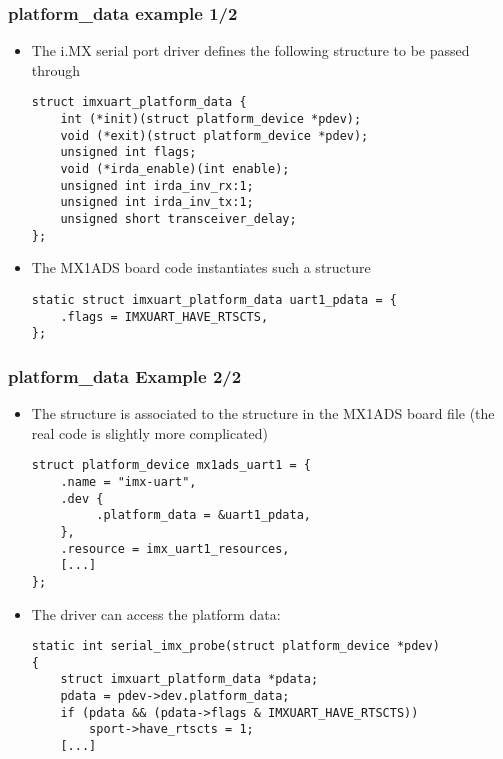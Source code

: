 \begin{frame}[fragile]
  \frametitle{platform\_data example 1/2}
  \begin{itemize}
  \item The i.MX serial port driver defines the following structure to
    be passed through 
    \begin{block}{}
  \begin{verbatim}
struct imxuart_platform_data {
    int (*init)(struct platform_device *pdev);
    void (*exit)(struct platform_device *pdev);
    unsigned int flags;
    void (*irda_enable)(int enable);
    unsigned int irda_inv_rx:1;
    unsigned int irda_inv_tx:1;
    unsigned short transceiver_delay;
};
  \end{verbatim}
  \end{block}
  \item The MX1ADS board code instantiates such a structure
    \begin{block}{}
  \begin{verbatim}
static struct imxuart_platform_data uart1_pdata = {
    .flags = IMXUART_HAVE_RTSCTS,
};
  \end{verbatim}
  \end{block}
  \end{itemize}
\end{frame}

\begin{frame}[fragile]
  \frametitle{platform\_data Example 2/2}
  \begin{itemize}
  \item The  structure is associated to the
     structure in the MX1ADS board file (the real code is
    slightly more complicated)
    \begin{block}{}
  \begin{verbatim}
struct platform_device mx1ads_uart1 = {
    .name = "imx-uart",
    .dev {
         .platform_data = &uart1_pdata,
    },
    .resource = imx_uart1_resources,
    [...]
};
  \end{verbatim}
  \end{block}
  \item The driver can access the platform data:
    \begin{block}{}
  \begin{verbatim}
static int serial_imx_probe(struct platform_device *pdev)
{
    struct imxuart_platform_data *pdata;
    pdata = pdev->dev.platform_data;
    if (pdata && (pdata->flags & IMXUART_HAVE_RTSCTS))
        sport->have_rtscts = 1;
    [...]
  \end{verbatim}
  \end{block}
\end{itemize}
\end{frame}

